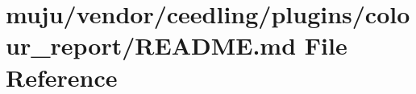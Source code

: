 \hypertarget{vendor_2ceedling_2plugins_2colour__report_2_r_e_a_d_m_e_8md}{}\section{muju/vendor/ceedling/plugins/colour\+\_\+report/\+R\+E\+A\+D\+ME.md File Reference}
\label{vendor_2ceedling_2plugins_2colour__report_2_r_e_a_d_m_e_8md}
